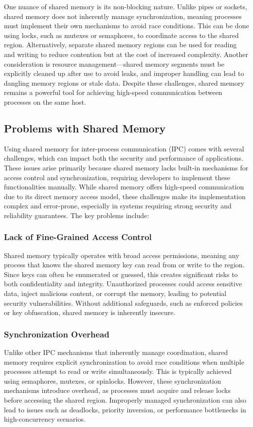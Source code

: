 \documentclass[letterpaper,twocolumn,10pt]{article}
\begin{document}
One nuance of shared memory is its non-blocking nature.
Unlike pipes or sockets, shared memory does not inherently manage synchronization, meaning processes must implement their own mechanisms to avoid race conditions.
This can be done using locks, such as mutexes or semaphores, to coordinate access to the shared region.
Alternatively, separate shared memory regions can be used for reading and writing to reduce contention but at the cost of increased complexity.
Another consideration is resource management—shared memory segments must be explicitly cleaned up after use to avoid leaks, and improper handling can lead to dangling memory regions or stale data.
Despite these challenges, shared memory remains a powerful tool for achieving high-speed communication between processes on the same host.

\subsection{Problems with Shared Memory}
Using shared memory for inter-process communication (IPC) comes with several challenges, which can impact both the security and performance of applications.
These issues arise primarily because shared memory lacks built-in mechanisms for access control and synchronization, requiring developers to implement these functionalities manually.
While shared memory offers high-speed communication due to its direct memory access model, these challenges make its implementation complex and error-prone, especially in systems requiring strong security and reliability guarantees.
The key problems include:

\subsubsection{Lack of Fine-Grained Access Control}
Shared memory typically operates with broad access permissions, meaning any process that knows the shared memory key can read from or write to the region.
Since keys can often be enumerated or guessed, this creates significant risks to both confidentiality and integrity.
Unauthorized processes could access sensitive data, inject malicious content, or corrupt the memory, leading to potential security vulnerabilities.
Without additional safeguards, such as enforced policies or key obfuscation, shared memory is inherently insecure.

\subsubsection{Synchronization Overhead} 
Unlike other IPC mechanisms that inherently manage coordination, shared memory requires explicit synchronization to avoid race conditions when multiple processes attempt to read or write simultaneously.
This is typically achieved using semaphores, mutexes, or spinlocks.
However, these synchronization mechanisms introduce overhead, as processes must acquire and release locks before accessing the shared region.
Improperly managed synchronization can also lead to issues such as deadlocks, priority inversion, or performance bottlenecks in high-concurrency scenarios.
\end{document}
